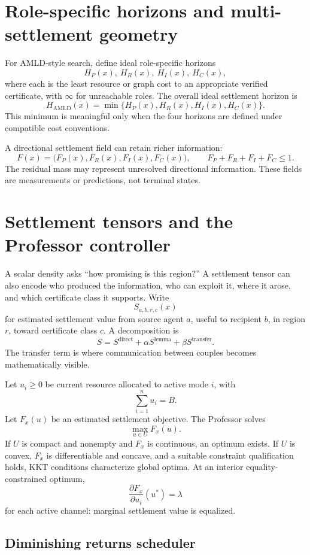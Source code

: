 \documentclass[11pt]{article}
\begin{document}
\section{Role-specific horizons and multi-settlement geometry}

For AMLD-style search, define ideal role-specific horizons
\[
H_P(x),\ H_R(x),\ H_I(x),\ H_C(x),
\]
where each is the least resource or graph cost to an appropriate verified certificate, with $\infty$ for unreachable roles. The overall ideal settlement horizon is
\[
H_{\mathrm{AMLD}}(x)=\min\{H_P(x),H_R(x),H_I(x),H_C(x)\}.
\]
This minimum is meaningful only when the four horizons are defined under compatible cost conventions.

A directional settlement field can retain richer information:
\[
F(x)=\bigl(F_P(x),F_R(x),F_I(x),F_C(x)\bigr),
\qquad
F_P+F_R+F_I+F_C\le 1.
\]
The residual mass may represent unresolved directional information. These fields are measurements or predictions, not terminal states.

\section{Settlement tensors and the Professor controller}

A scalar density asks ``how promising is this region?'' A settlement tensor can also encode who produced the information, who can exploit it, where it arose, and which certificate class it supports. Write
\[
S_{a,b,r,c}(x)
\]
for estimated settlement value from source agent $a$, useful to recipient $b$, in region $r$, toward certificate class $c$. A decomposition is
\[
S=S^{\mathrm{direct}}+\alpha S^{\mathrm{lemma}}+\beta S^{\mathrm{transfer}}.
\]
The transfer term is where communication between couples becomes mathematically visible.

Let $u_i\ge 0$ be current resource allocated to active mode $i$, with
\[
\sum_{i=1}^n u_i=B.
\]
Let $F_x(u)$ be an estimated settlement objective. The Professor solves
\[
\max_{u\in U}F_x(u).
\]
If $U$ is compact and nonempty and $F_x$ is continuous, an optimum exists. If $U$ is convex, $F_x$ is differentiable and concave, and a suitable constraint qualification holds, KKT conditions characterize global optima. At an interior equality-constrained optimum,
\[
\frac{\partial F_x}{\partial u_i}(u^*)=\lambda
\]
for each active channel: marginal settlement value is equalized.

\subsection{Diminishing returns scheduler}
\end{document}
